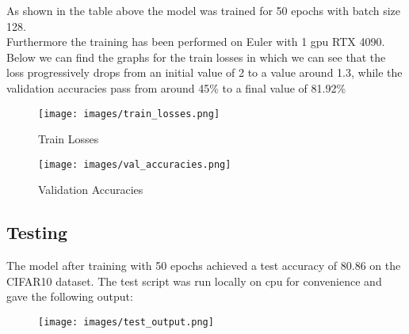 \documentclass{ETHExercise}
\begin{document}
As shown in the table above the model was trained for 50 epochs with batch size 128.
\\
Furthermore the training has been performed on Euler with 1 gpu RTX 4090. 
\\
Below we can find the graphs for the train losses in which we can see that the 
loss progressively drops from an initial value of 2 to a value around 1.3, while the validation accuracies
pass from around 45\% to a final value of 81.92\%

\begin{figure}[h]
  \centering
  \texttt{[image: images/train\_losses.png]}
  \caption{Train Losses}
\end{figure}
\begin{figure}[h]
  \centering
  \texttt{[image: images/val\_accuracies.png]}
  \caption{Validation Accuracies}
\end{figure}

\newpage
\subsection{Testing}
The model after training with 50 epochs achieved a test accuracy of 80.86 on the CIFAR10 dataset.
The test script was run locally on cpu for convenience and gave the following output:
\begin{figure}[h]
  \centering
  \texttt{[image: images/test\_output.png]}
\end{figure}
\end{document}
